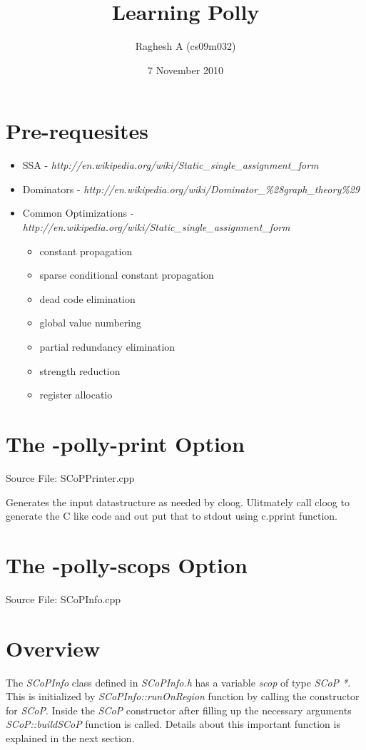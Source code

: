 \documentclass[a4paper,10pt]{article}
\title{Learning Polly}
\date{7 November 2010}
\author{Raghesh A (cs09m032)}
\begin{document}
\maketitle

\section{Pre-requesites}
\begin{itemize}
\item SSA - \emph{http://en.wikipedia.org/wiki/Static\_single\_assignment\_form}
\item Dominators - \emph{http://en.wikipedia.org/wiki/Dominator\_\%28graph\_theory\%29}
\item Common Optimizations - \emph{http://en.wikipedia.org/wiki/Static\_single\_assignment\_form}
\begin{itemize}
\item constant propagation
\item  sparse conditional constant propagation
\item  dead code elimination
\item  global value numbering
\item  partial redundancy elimination
\item  strength reduction
\item  register allocatio
\end{itemize}
\end{itemize}
\section{The -polly-print Option}

Source File: SCoPPrinter.cpp

Generates the input datastructure as needed by cloog. Ulitmately call cloog to generate the C like code and 
out put that to stdout using c.pprint function.


\section{The -polly-scops Option}

Source File: SCoPInfo.cpp

\section{Overview}

The \emph{SCoPInfo} class defined in \emph{SCoPInfo.h} has a variable \emph{scop} of type \emph{SCoP *}. This is 
initialized by \emph{SCoPInfo::runOnRegion} function by calling the constructor for \emph{SCoP}. Inside the \emph{SCoP}
constructor after filling up the necessary arguments \emph{SCoP::buildSCoP} function is called. Details about this
important function is explained in the next section.
\end{document}
